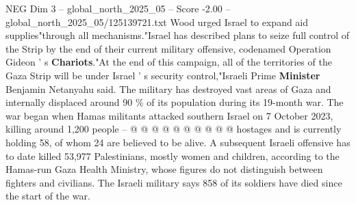 \begin{textsample}{NEG Dim 3 – global\_north\_2025\_05 – Score -2.00 – global\_north\_2025\_05/125139721.txt}
Wood urged Israel to expand aid supplies"through all mechanisms."Israel has described plans to seize full control of the Strip by the end of their current military offensive, codenamed Operation Gideon ' s \textbf{Chariots}."At the end of this campaign, all of the territories of the Gaza Strip will be under Israel ' s security control,"Israeli Prime \textbf{Minister} Benjamin Netanyahu said.
The military has destroyed vast areas of Gaza and internally displaced around 90 \% of its population during its 19-month war.
The war began when Hamas militants attacked southern Israel on 7 October 2023, killing around 1,200 people -- @ @ @ @ @ @ @ @ @ @ hostages and is currently holding 58, of whom 24 are believed to be alive.
A subsequent Israeli offensive has to date killed 53,977 Palestinians, mostly women and children, according to the Hamas-run Gaza Health Ministry, whose figures do not distinguish between fighters and civilians.
The Israeli military says 858 of its soldiers have died since the start of the war.

\end{textsample}
